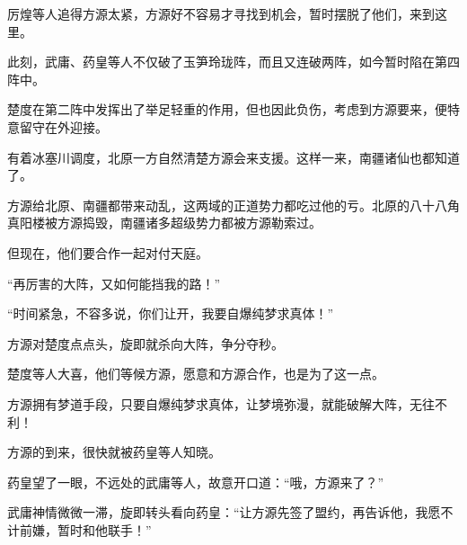 \begin{this_body}
厉煌等人追得方源太紧，方源好不容易才寻找到机会，暂时摆脱了他们，来到这里。

此刻，武庸、药皇等人不仅破了玉笋玲珑阵，而且又连破两阵，如今暂时陷在第四阵中。

楚度在第二阵中发挥出了举足轻重的作用，但也因此负伤，考虑到方源要来，便特意留守在外迎接。

有着冰塞川调度，北原一方自然清楚方源会来支援。这样一来，南疆诸仙也都知道了。

方源给北原、南疆都带来动乱，这两域的正道势力都吃过他的亏。北原的八十八角真阳楼被方源捣毁，南疆诸多超级势力都被方源勒索过。

但现在，他们要合作一起对付天庭。

“再厉害的大阵，又如何能挡我的路！”

“时间紧急，不容多说，你们让开，我要自爆纯梦求真体！”

方源对楚度点点头，旋即就杀向大阵，争分夺秒。

楚度等人大喜，他们等候方源，愿意和方源合作，也是为了这一点。

方源拥有梦道手段，只要自爆纯梦求真体，让梦境弥漫，就能破解大阵，无往不利！

方源的到来，很快就被药皇等人知晓。

药皇望了一眼，不远处的武庸等人，故意开口道：“哦，方源来了？”

武庸神情微微一滞，旋即转头看向药皇：“让方源先签了盟约，再告诉他，我愿不计前嫌，暂时和他联手！”

\end{this_body}

